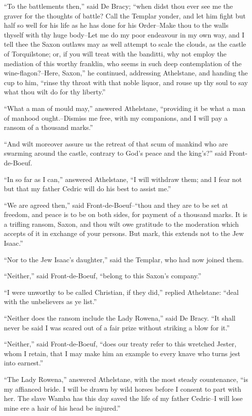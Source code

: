 ``To the battlements then,'' said De Bracy; ``when didst thou ever see
me the graver for the thoughts of battle? Call the Templar yonder, and
let him fight but half so well for his life as he has done for his
Order--Make thou to the walls thyself with thy huge body--Let me do my
poor endeavour in my own way, and I tell thee the Saxon outlaws may as
well attempt to scale the clouds, as the castle of Torquilstone; or, if
you will treat with the banditti, why not employ the mediation of this
worthy franklin, who seems in such deep contemplation of the
wine-flagon?--Here, Saxon,'' he continued, addressing Athelstane, and
handing the cup to him, ``rinse thy throat with that noble liquor, and
rouse up thy soul to say what thou wilt do for thy liberty.''

``What a man of mould may,'' answered Athelstane, ``providing it be what
a man of manhood ought.--Dismiss me free, with my companions, and I will
pay a ransom of a thousand marks.''

``And wilt moreover assure us the retreat of that scum of mankind who
are swarming around the castle, contrary to God's peace and the
king's?'' said Front-de-Boeuf.

``In so far as I can,'' answered Athelstane, ``I will withdraw them; and
I fear not but that my father Cedric will do his best to assist me.''

``We are agreed then,'' said Front-de-Boeuf--``thou and they are to be
set at freedom, and peace is to be on both sides, for payment of a
thousand marks. It is a trifling ransom, Saxon, and thou wilt owe
gratitude to the moderation which accepts of it in exchange of your
persons. But mark, this extends not to the Jew Isaac.''

``Nor to the Jew Isaac's daughter,'' said the Templar, who had now
joined them.

``Neither,'' said Front-de-Boeuf, ``belong to this Saxon's company.''

``I were unworthy to be called Christian, if they did,'' replied
Athelstane: ``deal with the unbelievers as ye list.''

``Neither does the ransom include the Lady Rowena,'' said De Bracy. ``It
shall never be said I was scared out of a fair prize without striking a
blow for it.''

``Neither,'' said Front-de-Boeuf, ``does our treaty refer to this
wretched Jester, whom I retain, that I may make him an example to every
knave who turns jest into earnest.''

``The Lady Rowena,'' answered Athelstane, with the most steady
countenance, ``is my affianced bride. I will be drawn by wild horses
before I consent to part with her. The slave Wamba has this day saved
the life of my father Cedric--I will lose mine ere a hair of his head be
injured.''

